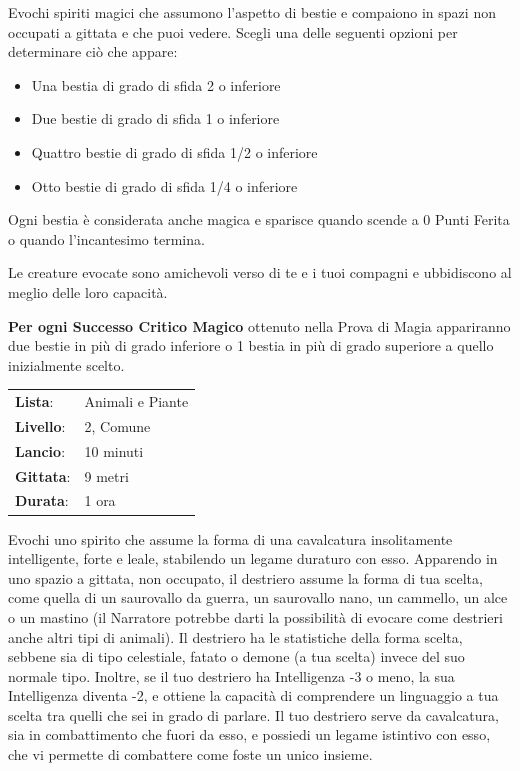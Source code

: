 \begin{multicols}{2}
Evochi spiriti magici che assumono l'aspetto di bestie e compaiono in spazi non occupati a gittata e che puoi vedere. Scegli una delle seguenti opzioni per determinare ciò che appare:

\begin{itemize}[leftmargin=*] \setlength{\itemsep}{-1pt}
	\item Una bestia di grado di sfida 2 o inferiore
	\item Due bestie di grado di sfida 1 o inferiore
	\item Quattro bestie di grado di sfida 1/2 o inferiore
	\item Otto bestie di grado di sfida 1/4 o inferiore
\end{itemize}

Ogni bestia è considerata anche magica e sparisce quando scende a 0 Punti Ferita o quando l'incantesimo termina.

Le creature evocate sono amichevoli verso di te e i tuoi compagni e ubbidiscono al meglio delle loro capacità.

\textbf{Per ogni Successo Critico Magico} ottenuto nella Prova di Magia appariranno due bestie in più di grado inferiore o 1 bestia in più di grado superiore a quello inizialmente scelto.

\noindent\begin{tabularx}{\linewidth}{p{1.3cm}X}
	\rowcolor{gray!20}\textbf{Lista}: & Animali e Piante \\
	\textbf{Livello}: & 2, Comune \\
	\rowcolor{gray!20}\textbf{Lancio}: & 10 minuti \\
	\textbf{Gittata}: & 9 metri \\
	\rowcolor{gray!20}\textbf{Durata}: & 1 ora \\
\end{tabularx}\smallskip

Evochi uno spirito che assume la forma di una cavalcatura insolitamente intelligente, forte e leale, stabilendo un legame duraturo con esso. Apparendo in uno spazio a gittata, non occupato, il destriero assume la forma di tua scelta, come quella di un saurovallo da guerra, un saurovallo nano, un cammello, un alce o un mastino (il Narratore potrebbe darti la possibilità di evocare come destrieri anche altri tipi di animali). Il destriero ha le statistiche della forma scelta, sebbene sia di tipo celestiale, fatato o demone (a tua scelta) invece del suo normale tipo. Inoltre, se il tuo destriero ha Intelligenza -3 o meno, la sua Intelligenza diventa -2, e ottiene la capacità di comprendere un linguaggio a tua scelta tra quelli che sei in grado di parlare. Il tuo destriero serve da cavalcatura, sia in combattimento che fuori da esso, e possiedi un legame istintivo con esso, che vi permette di combattere come foste un unico insieme.


\end{multicols}

